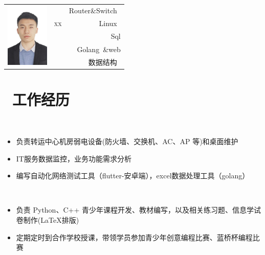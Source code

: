 \documentclass{resume}
\begin{document}

\Large{
  \begin{tabu}{ c l r }
     &  & {Router\&Switch~} \\
    & \scshape{xx} & {Linux~} \\
    & \email{} & {Sql} \\
    &  & {Golang~\&web} \\
    &  & {数据结构~}
  \end{tabu}
}
 
\section{\faUsers\ 工作经历}
 ~ ~
\begin{itemize}
  \item 负责转运中心机房弱电设备(防火墙、交换机、AC、AP 等)和桌面维护
  \item IT服务数据监控，业务功能需求分析
  \item 编写自动化网络测试工具（flutter-安卓端），excel数据处理工具（golang）
\end{itemize}

~
\begin{itemize}
  \item 负责 Python、C++ 青少年课程开发、教材编写，以及相关练习题、信息学试卷制作(\LaTeX 排版)
  \item 定期定时到合作学校授课，带领学员参加青少年创意编程比赛、蓝桥杯编程比赛
\end{itemize}



\end{document}
